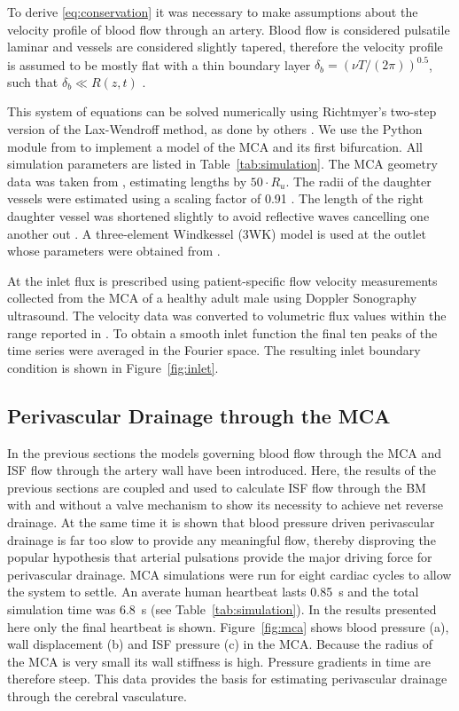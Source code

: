\documentclass{frontiersFPHY} %
\begin{document}
To derive \eqref{eq:conservation} it was necessary to make assumptions about the velocity profile of blood flow through an artery. Blood flow is considered pulsatile laminar and vessels are considered slightly tapered, therefore the velocity profile is assumed to be mostly flat with a thin boundary layer $\delta_b = (\nu T/(2\pi))^{0.5}$, such that $\delta_b \ll R(z,t)$ \cite{Olufsen2000}.

This system of equations can be solved numerically using Richtmyer's two-step version of the Lax-Wendroff method, as done by others \cite{Olufsen2000,LeVeque1992,Kolachalama2007}. We use the Python module from \cite{Diem2016a} to implement a model of the MCA and its first bifurcation. All simulation parameters are listed in Table~\ref{tab:simulation}. The MCA geometry data was taken from \cite{Cousins2014}, estimating lengths by $50 \cdot R_u$. The radii of the daughter vessels were estimated using a scaling factor of 0.91 \cite{Cousins2014}. The length of the right daughter vessel was shortened slightly to avoid reflective waves cancelling one another out \cite{Kolachalama2007}. A three-element Windkessel (3WK) model is used at the outlet whose parameters were obtained from \cite{Olufsen2002}.

At the inlet flux is prescribed using patient-specific flow velocity measurements collected from the MCA of a healthy adult male using Doppler Sonography ultrasound. The velocity data was converted to volumetric flux values within the range reported in \cite{Olufsen2002}. To obtain a smooth inlet function the final ten peaks of the time series were averaged in the Fourier space. The resulting inlet boundary condition is shown in Figure~\ref{fig:inlet}.

\subsection{Perivascular Drainage through the MCA}

In the previous sections the models governing blood flow through the MCA and ISF flow through the artery wall have been introduced. Here, the results of the previous sections are coupled and used to calculate ISF flow through the BM with and without a valve mechanism to show its necessity to achieve net reverse drainage. At the same time it is shown that blood pressure driven perivascular drainage is far too slow to provide any meaningful flow, thereby disproving the popular hypothesis that arterial pulsations provide the major driving force for perivascular drainage. MCA simulations were run for eight cardiac cycles to allow the system to settle. An averate human heartbeat lasts \SI{0.85}{\second} and the total simulation time was \SI{6.8}{\second} (see Table~\ref{tab:simulation}). In the results presented here only the final heartbeat is shown. Figure~\ref{fig:mca} shows blood pressure (a), wall displacement (b) and ISF pressure (c) in the MCA. Because the radius of the MCA is very small its wall stiffness is high. Pressure gradients in time are therefore steep. This data provides the basis for estimating perivascular drainage through the cerebral vasculature.
\end{document}
